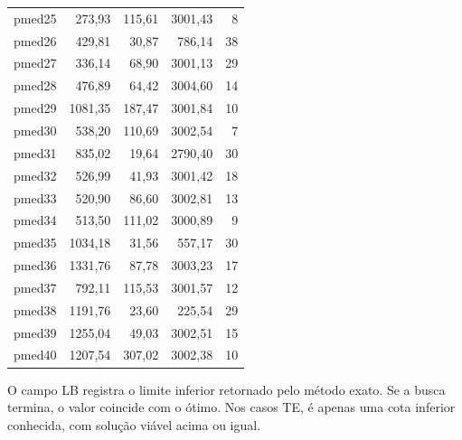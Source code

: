 \documentclass[12pt,a4paper]{article}
\begin{document}
\begin{longtable}{@{}lrrrr@{}}
pmed25 & 273,93 & 115,61 & 3001,43 & 8 \\
pmed26 & 429,81 & 30,87 & 786,14 & 38 \\
pmed27 & 336,14 & 68,90 & 3001,13 & 29 \\
pmed28 & 476,89 & 64,42 & 3004,60 & 14 \\
pmed29 & 1081,35 & 187,47 & 3001,84 & 10 \\
pmed30 & 538,20 & 110,69 & 3002,54 & 7 \\
pmed31 & 835,02 & 19,64 & 2790,40 & 30 \\
pmed32 & 526,99 & 41,93 & 3001,42 & 18 \\
pmed33 & 520,90 & 86,60 & 3002,81 & 13 \\
pmed34 & 513,50 & 111,02 & 3000,89 & 9 \\
pmed35 & 1034,18 & 31,56 & 557,17 & 30 \\
pmed36 & 1331,76 & 87,78 & 3003,23 & 17 \\
pmed37 & 792,11 & 115,53 & 3001,57 & 12 \\
pmed38 & 1191,76 & 23,60 & 225,54 & 29 \\
pmed39 & 1255,04 & 49,03 & 3002,51 & 15 \\
pmed40 & 1207,54 & 307,02 & 3002,38 & 10 \\
\bottomrule
\end{longtable}
O campo LB registra o limite inferior retornado pelo método exato. Se
a busca termina, o valor coincide com o ótimo. Nos casos TE,
é apenas uma cota inferior conhecida, com solução viável acima ou igual.
\end{document}
